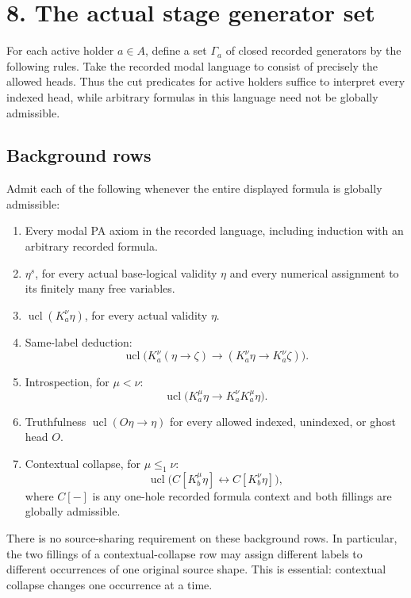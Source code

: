 \documentclass[
  11pt,
  letterpaper,
]{article}
\providecommand{\tightlist}{%
  \setlength{\itemsep}{0pt}\setlength{\parskip}{0pt}}
\begin{document}
\section{8. The actual stage generator
set}\label{the-actual-stage-generator-set}

For each active holder \(a\in A\), define a set \(\Gamma_a\) of closed
recorded generators by the following rules. Take the recorded modal
language to consist of precisely the allowed heads. Thus the cut
predicates for active holders suffice to interpret every indexed head,
while arbitrary formulas in this language need not be globally
admissible.

\subsection{Background rows}\label{background-rows}

Admit each of the following whenever the entire displayed formula is
globally admissible:

\begin{enumerate}
\def\labelenumi{\arabic{enumi}.}
\tightlist
\item
  Every modal PA axiom in the recorded language, including induction
  with an arbitrary recorded formula.
\item
  \(\eta^s\), for every actual base-logical validity \(\eta\) and every
  numerical assignment to its finitely many free variables.
\item
  \(\operatorname{ucl}(K_a^\nu\eta)\), for every actual validity
  \(\eta\).
\item
  Same-label deduction: \[
  \operatorname{ucl}\bigl(
  K_a^\nu(\eta\to\zeta)\to
  (K_a^\nu\eta\to K_a^\nu\zeta)\bigr).
  \]
\item
  Introspection, for \(\mu<\nu\): \[
  \operatorname{ucl}\bigl(
  K_a^\mu\eta\to K_a^\nu K_a^\mu\eta\bigr).
  \]
\item
  Truthfulness \(\operatorname{ucl}(O\eta\to\eta)\) for every allowed
  indexed, unindexed, or ghost head \(O\).
\item
  Contextual collapse, for \(\mu\leq_1\nu\): \[
  \operatorname{ucl}\bigl(
  C[K_b^\mu\eta]\leftrightarrow C[K_b^\nu\eta]\bigr),
  \tag{CC}
  \] where \(C[-]\) is any one-hole recorded formula context and both
  fillings are globally admissible.
\end{enumerate}

There is no source-sharing requirement on these background rows. In
particular, the two fillings of a contextual-collapse row may assign
different labels to different occurrences of one original source shape.
This is essential: contextual collapse changes one occurrence at a time.
\end{document}
